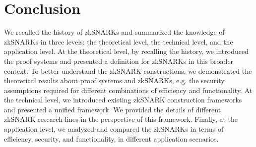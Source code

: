 \documentclass[acmtog]{acmart}
\begin{document}
\section{Conclusion}

We recalled the history of zkSNARKs and summarized the knowledge of zkSNARKs in three levels: the theoretical level, the technical level, and the application level.
At the theoretical level, by recalling the history, we introduced the proof systems and presented a definition for zkSNARKs in this broader context.
To better understand the zkSNARK constructions, we demonstrated the theoretical results about proof systems and zkSNARKs, e.g. the security assumptions required for different combinations of efficiency and functionality.
At the technical level, we introduced existing zkSNARK construction frameworks and presented a unified framework.
We provided the details of different zkSNARK research lines in the perspective of this framework.
Finally, at the application level, we analyzed and compared the zkSNARKs in terms of efficiency, security, and functionality, in different application scenarios.



\end{document}
